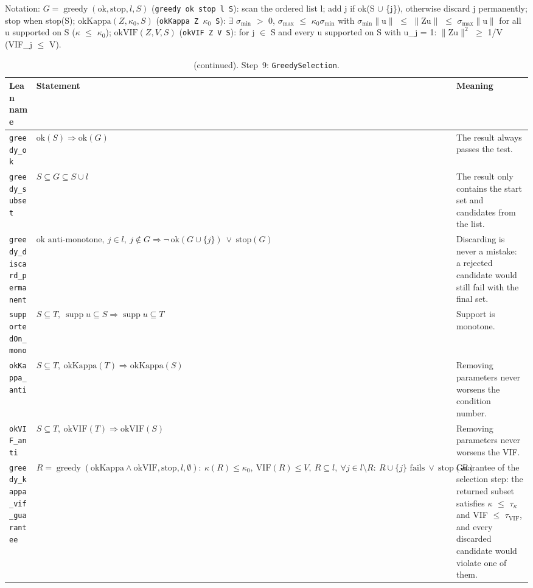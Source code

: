 {\small\raggedright Notation: $G=\operatorname{greedy}(\mathrm{ok},\mathrm{stop},l,S)$ (\texttt{greedy ok stop l S}): scan the ordered list l; add j if ok(S $\cup$ \{j\}), otherwise discard j permanently; stop when stop(S); $\mathrm{okKappa}(Z,\kappa_0,S)$ (\texttt{okKappa Z $\kappa_0$ S}): $\exists$ $\sigma_{\min}$ $>$ 0, $\sigma_{\max}$ $\le$ $\kappa_0\sigma_{\min}$ with $\sigma_{\min}\|$u$\|$ $\le$ $\|$Zu$\|$ $\le$ $\sigma_{\max}\|$u$\|$ for all u supported on S ($\kappa$ $\le$ $\kappa_0$); $\mathrm{okVIF}(Z,V,S)$ (\texttt{okVIF Z V S}): for j $\in$ S and every u supported on S with u\_j = 1: $\|$Zu$\|^2$ $\ge$ 1/V (VIF\_j $\le$ V).}

\addtocounter{table}{-1}
{\small
\begin{longtable}{@{}>{\raggedright\arraybackslash}p{3.6cm}>{\raggedright\arraybackslash}p{6.6cm}>{\raggedright\arraybackslash}p{5.6cm}@{}}
\caption[]{(continued). Step~9: \texttt{GreedySelection}.}\\
\toprule
Lean name & Statement & Meaning \\
\midrule
\endhead
\texttt{greedy\_\allowbreak{}ok} & $\displaystyle \mathrm{ok}(S)\Rightarrow\mathrm{ok}(G)$ & The result always passes the test. \\[3pt]
\texttt{greedy\_\allowbreak{}subset} & $\displaystyle S\subseteq G\subseteq S\cup l$ & The result only contains the start set and candidates from the list. \\[3pt]
\texttt{greedy\_\allowbreak{}discard\_\allowbreak{}permanent} & $\displaystyle \mathrm{ok}\text{ anti-monotone},\ j\in l,\ j\notin G\Rightarrow\neg\,\mathrm{ok}(G\cup\{j\})\ \lor\ \mathrm{stop}(G)$ & Discarding is never a mistake: a rejected candidate would still fail with the final set. \\[3pt]
\texttt{supportedOn\_\allowbreak{}mono} & $\displaystyle S\subseteq T,\ \operatorname{supp}u\subseteq S\Rightarrow\operatorname{supp}u\subseteq T$ & Support is monotone. \\[3pt]
\texttt{okKappa\_\allowbreak{}anti} & $\displaystyle S\subseteq T,\ \mathrm{okKappa}(T)\Rightarrow\mathrm{okKappa}(S)$ & Removing parameters never worsens the condition number. \\[3pt]
\texttt{okVIF\_\allowbreak{}anti} & $\displaystyle S\subseteq T,\ \mathrm{okVIF}(T)\Rightarrow\mathrm{okVIF}(S)$ & Removing parameters never worsens the VIF. \\[3pt]
\texttt{greedy\_\allowbreak{}kappa\_\allowbreak{}vif\_\allowbreak{}guarantee} & $\displaystyle R=\operatorname{greedy}(\mathrm{okKappa}\wedge\mathrm{okVIF},\mathrm{stop},l,\emptyset):\ \kappa(R)\le\kappa_0,\ \mathrm{VIF}(R)\le V,\ R\subseteq l,\ \forall j\in l\setminus R:\ R\cup\{j\}\text{ fails}\ \lor\ \mathrm{stop}(R)$ & Guarantee of the selection step: the returned subset satisfies $\kappa$ $\le$ $\tau_\kappa$ and VIF $\le$ $\tau_{\mathrm{VIF}}$, and every discarded candidate would violate one of them. \\[3pt]
\bottomrule
\end{longtable}
}

